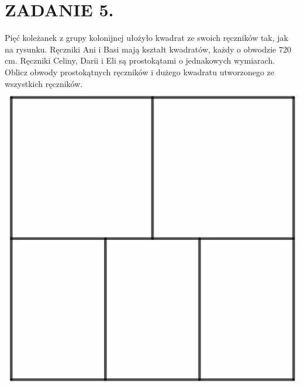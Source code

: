 \documentclass[10pt]{article}
\begin{document}
\section*{ZADANIE 5.}
Pięć koleżanek z grupy kolonijnej ułożyło kwadrat ze swoich ręczników tak, jak na rysunku. Ręczniki Ani i Basi mają kształt kwadratów, każdy o obwodzie 720 cm. Ręczniki Celiny, Darii i Eli są prostokątami o jednakowych wymiarach. Oblicz obwody prostokątnych ręczników i dużego kwadratu utworzonego ze wszystkich ręczników.\\
\includegraphics[max width=\textwidth, center]{2024_11_21_3ef8bd11d8ae747125ecg-1}
\end{document}
